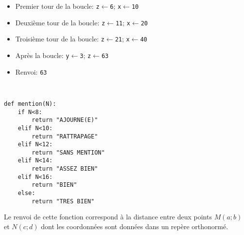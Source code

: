 \begin{correction}
\begin{enumerate}
\begin{itemize}
			\item Premier tour de la boucle: \texttt{z$\leftarrow$6}; \texttt{x$\leftarrow$10}
			\item Deuxième tour de la boucle: \texttt{z$\leftarrow$11}; \texttt{x$\leftarrow$20}
			\item Troisième tour de la boucle: \texttt{z$\leftarrow$21}; \texttt{x$\leftarrow$40}
			\item Après la boucle: \texttt{y$\leftarrow$3}; \texttt{z$\leftarrow$63}
			\item Renvoi: \texttt{63}
		\end{itemize}
	\end{enumerate}
\end{correction}


\begin{correction}~
	\begin{center}
		\begin{varwidth}[t]{.5\textwidth}
			\begin{lstlisting}[language=iPython,linewidth = 8cm]
def mention(N):
    if N<8:
        return "AJOURNE(E)"
    elif N<10:
        return "RATTRAPAGE"
    elif N<12:
        return "SANS MENTION"
    elif N<14:
        return "ASSEZ BIEN"
    elif N<16:
        return "BIEN"
    else:
        return "TRES BIEN"
\end{lstlisting}
		\end{varwidth}\end{center}
\end{correction}


\begin{correction}
	Le renvoi de cette fonction correspond à la distance entre deux points $M(a;b)$ et $N(c;d)$ dont les coordonnées sont données dans un repère orthonormé.
\end{correction}



